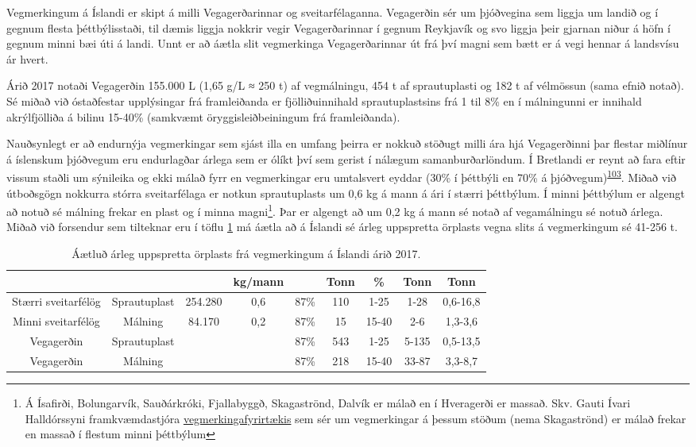 \documentclass[icelandic,]{book}
\let\rmarkdownfootnote\footnote%
\def\footnote{\protect\rmarkdownfootnote}
\begin{document}
Vegmerkingum á Íslandi er skipt á milli Vegagerðarinnar og sveitarfélaganna. Vegagerðin sér um þjóðvegina sem liggja um landið og í gegnum flesta þéttbýlisstaði, til dæmis liggja nokkrir vegir Vegagerðarinnar í gegnum Reykjavík og svo liggja þeir gjarnan niður á höfn í gegnum minni bæi úti á landi. Unnt er að áætla slit vegmerkinga Vegagerðarinnar út frá því magni sem bætt er á vegi hennar á landsvísu ár hvert.

Árið 2017 notaði Vegagerðin 155.000 L (1,65 g/L ≈ 250 t) af vegmálningu, 454 t af sprautuplasti og 182 t af vélmössun (sama efnið notað). Sé miðað við óstaðfestar upplýsingar frá framleiðanda er fjölliðuinnihald sprautuplastsins frá 1 til 8\% en í málningunni er innihald akrýlfjölliða á bilinu 15-40\% (samkvæmt öryggisleiðbeiningum frá framleiðanda).

Nauðsynlegt er að endurnýja vegmerkingar sem sjást illa en umfang þeirra er nokkuð stöðugt milli ára hjá Vegagerðinni þar flestar miðlínur á íslenskum þjóðvegum eru endurlagðar árlega sem er ólíkt því sem gerist í nálægum samanburðarlöndum. Í Bretlandi er reynt að fara eftir vissum staðli um sýnileika og ekki málað fyrr en vegmerkingar eru umtalsvert eyddar (30\% í þéttbýli en 70\% á þjóðvegum)\textsuperscript{\protect\hyperlink{ref-Hann2018}{103}}. Miðað við útboðsgögn nokkurra stórra sveitarfélaga er notkun sprautuplasts um 0,6 kg á mann á ári í stærri þéttbýlum. Í minni þéttbýlum er algengt að notuð sé málning frekar en plast og í minna magni\footnote{Á Ísafirði, Bolungarvík, Sauðárkróki, Fjallabyggð, Skagaströnd, Dalvík er málað en í Hveragerði er massað. Skv. Gauti Ívari Halldórssyni framkvæmdastjóra \href{http://www.bilastaedamalun.is/}{vegmerkingafyrirtækis} sem sér um vegmerkingar á þessum stöðum (nema Skagaströnd) er málað frekar en massað í flestum minni þéttbýlum}. Þar er algengt að um 0,2 kg á mann sé notað af vegamálningu sé notuð árlega. Miðað við forsendur sem tilteknar eru í töflu \ref{tab:vegmerkingar} má áætla að á Íslandi sé árleg uppspretta örplasts vegna slits á vegmerkingum sé 41-256 t.

\begin{table}[t]

\caption{\label{tab:vegmerkingar}Áætluð árleg uppspretta örplasts frá vegmerkingum á Íslandi árið 2017.}
\centering
\begin{tabular}{ccccccccc}
\toprule
 &  &  & kg/mann &  & Tonn & \% & Tonn & Tonn\\
\midrule
Stærri sveitarfélög & Sprautuplast & 254.280 & 0,6 & 87\% & 110 & 1-25 & 1-28 & 0,6-16,8\\
Minni sveitarfélög & Málning & 84.170 & 0,2 & 87\% & 15 & 15-40 & 2-6 & 1,3-3,6\\
Vegagerðin & Sprautuplast &  &  & 87\% & 543 & 1-25 & 5-135 & 0,5-13,5\\
Vegagerðin & Málning &  &  & 87\% & 218 & 15-40 & 33-87 & 3,3-8,7\\
\bottomrule
\end{tabular}
\end{table}
\end{document}

